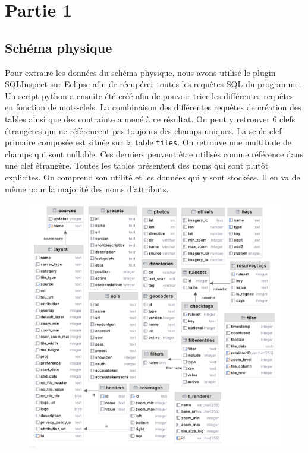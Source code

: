 \section{Partie 1}
\subsection{Schéma physique}
Pour extraire les données du schéma physique, nous avons utilisé le plugin SQLInspect sur Eclipse afin de récupérer toutes les requêtes SQL du programme. Un script python a ensuite été créé afin de pouvoir trier les différentes requêtes en fonction de mots-clefs. La combinaison des différentes requêtes de création des tables ainsi que des contrainte a mené à ce résultat. On peut y retrouver 6 clefs étrangères qui ne référencent pas toujours des champs uniques. La seule clef primaire composée est située sur la table \texttt{tiles}. On retrouve une multitude de champs qui sont nullable. Ces derniers peuvent être utilisés comme référence dans une clef étrangère.
Toutes les tables présentent des noms qui sont plutôt explicites. On comprend son utilité et les données qui y sont stockées. Il en va de même pour la majorité des noms d'attributs.
\begin{figure}[!ht]
    \centering
    \includegraphics[scale=1]{schema_physique.png}
    \label{fig:schéma physique}
\end{figure}

